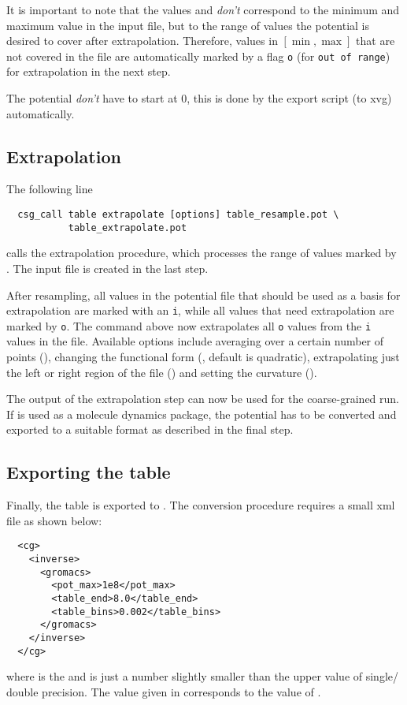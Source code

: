 It is important to note that the values  and  \textit{don't} correspond to the minimum and maximum value in the input file, but to the range of values the potential is desired to cover after extrapolation. Therefore, values in $[ \min,\max ]$ that are not covered in the file are automatically marked by a flag \texttt{o} (for \texttt{out of range}) for extrapolation in the next step.

The potential \textit{don't} have to start at 0, this is done by the export script (to xvg) automatically.

\subsection{Extrapolation}
The following line
\begin{verbatim}
  csg_call table extrapolate [options] table_resample.pot \
           table_extrapolate.pot
\end{verbatim}
calls the extrapolation procedure, which processes the range of values marked by . The input file is  created in the last step.

After resampling, all values in the potential file that should be used as a basis for extrapolation are marked with an \texttt{i}, while all values that need extrapolation are marked by \texttt{o}. The command above now extrapolates all \texttt{o} values from the \texttt{i} values in the file. Available options include averaging over a certain number of points (), changing the functional form (, default is quadratic), extrapolating just the left or right region of the file () and setting the curvature ().

The output  of the extrapolation step can now be used for the coarse-grained run. If \gromacs is used as a molecule dynamics package, the potential has to be converted and exported to a suitable \gromacs format as described in the final step.

\subsection{Exporting the table}
Finally, the table is exported to . The conversion procedure requires a small xml file  as shown below:
\begin{verbatim}
  <cg>
    <inverse>
      <gromacs>
        <pot_max>1e8</pot_max>
        <table_end>8.0</table_end>
        <table_bins>0.002</table_bins>
      </gromacs>
    </inverse>
  </cg>
\end{verbatim}
where  is the \gromacs {} and  is just a number slightly smaller than the upper value of single/ double precision. The value given in  corresponds to the  value of .


